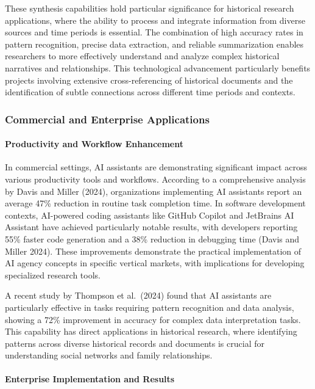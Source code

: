 \documentclass[
]{article}
\begin{document}
These synthesis capabilities hold particular significance for historical
research applications, where the ability to process and integrate
information from diverse sources and time periods is essential. The
combination of high accuracy rates in pattern recognition, precise data
extraction, and reliable summarization enables researchers to more
effectively understand and analyze complex historical narratives and
relationships. This technological advancement particularly benefits
projects involving extensive cross-referencing of historical documents
and the identification of subtle connections across different time
periods and contexts.

\subsubsection{Commercial and Enterprise
Applications}\label{commercial-and-enterprise-applications}

\paragraph{Productivity and Workflow
Enhancement}\label{productivity-and-workflow-enhancement}

In commercial settings, AI assistants are demonstrating significant
impact across various productivity tools and workflows. According to a
comprehensive analysis by Davis and Miller (2024), organizations
implementing AI assistants report an average 47\% reduction in routine
task completion time. In software development contexts, AI-powered
coding assistants like GitHub Copilot and JetBrains AI Assistant have
achieved particularly notable results, with developers reporting 55\%
faster code generation and a 38\% reduction in debugging time (Davis and
Miller 2024). These improvements demonstrate the practical
implementation of AI agency concepts in specific vertical markets, with
implications for developing specialized research tools.

A recent study by Thompson et al.~(2024) found that AI assistants are
particularly effective in tasks requiring pattern recognition and data
analysis, showing a 72\% improvement in accuracy for complex data
interpretation tasks. This capability has direct applications in
historical research, where identifying patterns across diverse
historical records and documents is crucial for understanding social
networks and family relationships.

\paragraph{Enterprise Implementation and
Results}\label{enterprise-implementation-and-results}
\end{document}
